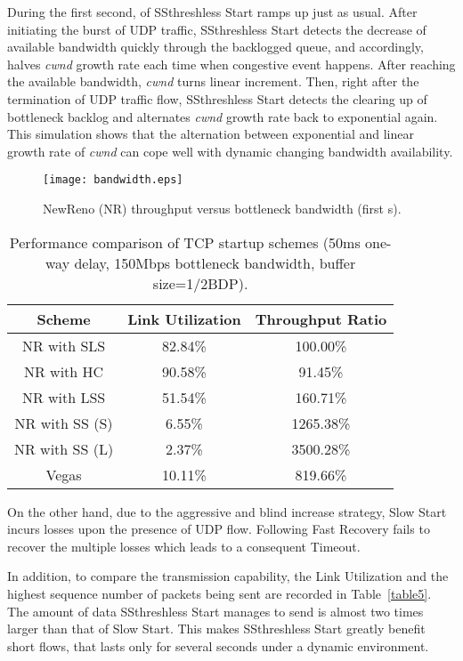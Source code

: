 \documentclass[12pt,onecolumn]{IEEEtran}
\begin{document}
During the first second,  of SSthreshless Start ramps up just as usual.
After initiating the burst of UDP traffic, SSthreshless Start detects the
decrease of available bandwidth quickly through the backlogged queue, and
accordingly, halves \emph{cwnd} growth rate each time when congestive event
happens. After reaching the available bandwidth, \emph{cwnd} turns linear
increment. Then, right after the termination of UDP traffic flow, SSthreshless
Start detects the clearing up of bottleneck backlog and alternates \emph{cwnd}
growth rate back to exponential again. This simulation shows that the
alternation between exponential and linear growth rate of \emph{cwnd} can cope
well with dynamic changing bandwidth availability.

\begin{figure}
\centering
\texttt{[image: bandwidth.eps]}
\caption{NewReno (NR) throughput versus bottleneck bandwidth (first  s).} \label{fig_Bandwidth}
\end{figure}
\begin{table}[h]
\centering
\label{table2}\caption{\footnotesize Performance comparison of TCP startup schemes (50ms one-way delay, 150Mbps bottleneck bandwidth, buffer size=1/2BDP).} \begin{tabular}{|c|c|c|} \hline
Scheme & Link Utilization & Throughput Ratio\\ \hline \hline
NR with SLS & 82.84\%  &   100.00\% \\ \hline
NR with HC & 90.58\%  &   91.45\%  \\ \hline
NR with LSS & 51.54\%  &   160.71\%  \\ \hline
NR with SS (S) &   6.55\% & 1265.38\%  \\ \hline
NR with SS (L) & 2.37\%  &   3500.28\% \\ \hline
Vegas  & 10.11\%  &   819.66\%  \\ \hline
\end{tabular}
\end{table}


On the other hand, due to the aggressive and blind increase strategy, Slow
Start incurs losses upon the presence of UDP flow. Following Fast Recovery
fails to recover the multiple losses which leads to a consequent Timeout.

In addition, to compare the transmission capability, the Link Utilization and
the highest sequence number of packets being sent are recorded in Table~\ref{table5}. The amount of
data SSthreshless Start manages to send is almost two times larger than that of
Slow Start. This makes SSthreshless Start greatly benefit short flows, that
lasts only for several seconds under a dynamic environment.
\end{document}
